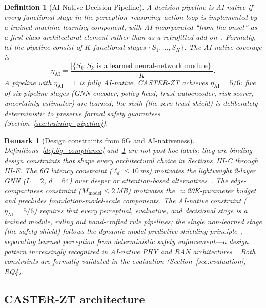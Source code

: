 \documentclass[10pt,journal,compsoc]{IEEEtran}
\newtheorem{remark}{Remark}
\newtheorem{definition}{Definition}
\begin{document}
\begin{definition}[AI-Native Decision Pipeline]
\label{def:ai_native}
A decision pipeline is \emph{AI-native} if every functional stage in the perception--reasoning--action loop is implemented by a trained machine-learning component, with AI incorporated ``from the onset'' as a first-class architectural element rather than as a retrofitted add-on~\cite{polese2025ainative,zhang2025ainative6g,liu2025nativeai6g,saad2020vision6g}.  Formally, let the pipeline consist of $K$ functional stages $\{S_1, \ldots, S_K\}$.  The \emph{AI-native coverage} is
\[
\eta_{\mathrm{AI}} = \frac{|\{S_k : S_k \text{ is a learned neural-network module}\}|}{K}.
\]
A pipeline with $\eta_{\mathrm{AI}} = 1$ is \emph{fully AI-native}.  CASTER-ZT achieves $\eta_{\mathrm{AI}} = 5/6$: five of six pipeline stages (GNN encoder, policy head, trust autoencoder, risk scorer, uncertainty estimator) are learned; the sixth (the zero-trust shield) is \emph{deliberately deterministic} to preserve formal safety guarantees~\cite{roderick2024dmps} (Section~\ref{sec:training_pipeline}).
\end{definition}

\begin{remark}[Design constraints from 6G and AI-nativeness]
\label{rem:6g_ainative}
Definitions~\ref{def:6g_compliance} and~\ref{def:ai_native} are not post-hoc labels; they are \emph{binding design constraints} that shape every architectural choice in Sections~III-C through III-E.
The 6G latency constraint ($\ell_d \le 10$\,ms) motivates the lightweight 2-layer GNN ($L=2$, $d=64$) over deeper or attention-based alternatives~\cite{velickovic2018gat}.
The edge-compactness constraint ($M_{\mathrm{model}} \le 2$\,MB) motivates the $\approx$20K-parameter budget and precludes foundation-model-scale components.
The AI-native constraint ($\eta_{\mathrm{AI}} = 5/6$) requires that every perceptual, evaluative, and decisional stage is a trained module, ruling out hand-crafted rule pipelines; the single non-learned stage (the safety shield) follows the \emph{dynamic model predictive shielding} principle~\cite{roderick2024dmps}, separating learned perception from deterministic safety enforcement---a design pattern increasingly recognized in AI-native PHY and RAN architectures~\cite{abousab2025ainativephy,liu2025nativeai6g}.
Both constraints are formally validated in the evaluation (Section~\ref{sec:evaluation}, RQ4).
\end{remark}


\subsection{CASTER-ZT architecture}
\end{document}
